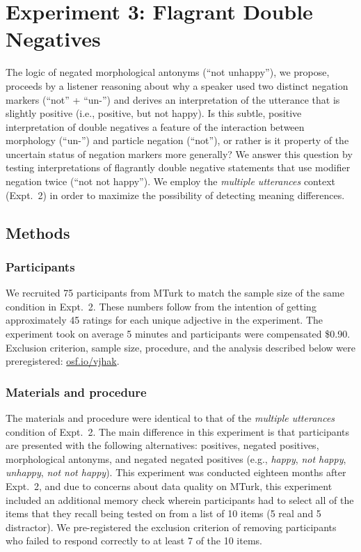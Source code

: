 \documentclass[floatsintext,doc]{apa6}
\begin{document}
\section{Experiment 3: Flagrant Double Negatives}\label{experiment-3-notnot}

The logic of negated morphological antonyms (``not unhappy''), we propose, proceeds by a listener reasoning about why a speaker used two distinct negation markers (``not'' + ``un-'') and derives an interpretation of the utterance that is slightly positive (i.e., positive, but not happy). 
Is this subtle, positive interpretation of double negatives a feature of the interaction between morphology (``un-'') and particle negation (``not''), or rather is it property of the uncertain status of negation markers more generally?
We answer this question by testing interpretations of flagrantly double negative statements that use modifier negation twice (``not not happy'').
We employ the \emph{multiple utterances} context (Expt.~2) in order to maximize the possibility of detecting meaning differences. 

\subsection{Methods}

\subsubsection{Participants}\label{participants-3}

We recruited 75 participants from MTurk to match the sample size of the same condition in Expt.~2.
These numbers follow from the intention of getting approximately 45 ratings for each unique adjective in the experiment.
The experiment took on average 5 minutes and participants were compensated \$0.90.
Exclusion criterion, sample size, procedure, and the analysis described below were preregistered: \url{osf.io/vjhak}.

\subsubsection{Materials and procedure}\label{materials-3}

The materials and procedure were identical to that of the \emph{multiple utterances} condition of Expt.~2.
The main difference in this experiment is that participants are presented with the following alternatives: positives, negated positives, morphological antonyms, and negated negated positives (e.g., \emph{happy}, \emph{not happy}, \emph{unhappy}, \emph{not not happy}).
This experiment was conducted eighteen months after Expt.~2, and due to concerns about data quality on MTurk, this experiment included an additional memory check wherein participants had to select all of the items that they recall being tested on from a list of 10 items (5 real and 5 distractor). 
We pre-registered the exclusion criterion of removing participants who failed to respond correctly to at least 7 of the 10 items. 
\end{document}
